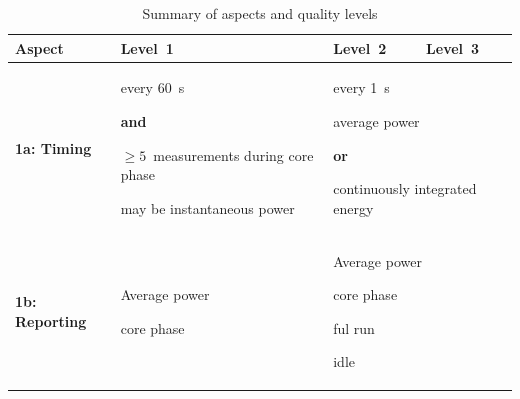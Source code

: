\newlength{\tablecolumnwidth}
\setlength{\tablecolumnwidth}{3.5cm}
\noindent
\begin{table}
\caption{Summary of aspects and quality levels}
\label{tab:levels}
\begin{tabular}{|p{2.5cm}|p{3.5cm}|p{3.5cm}|p{3.5cm}|} \hline
\textbf{Aspect}&\textbf{Level~1}&\textbf{Level~2}&\textbf{Level~3}\\ \hline

\textbf{1a: Timing} &
\begin{minipage}[t]{\tablecolumnwidth}
      \begin{compactitemize}
            \item every 60~s
            \item[] \textbf{and}
            \item $\ge5$~measurements during core phase
            \item may be instantaneous power
      \end{compactitemize}
\end{minipage} &
\multicolumn{2}{p{2\tablecolumnwidth}|}{
      \begin{minipage}[t]{2\tablecolumnwidth}
            \begin{compactitemize}
                  \item every 1~s
                  \item average power
                  \item[] \textbf{or}
                  \item continuously integrated energy
            \end{compactitemize}
      \end{minipage}
} \\
\hline


\textbf{1b: Reporting} &
\begin{minipage}[t]{\tablecolumnwidth}
      Average power
      \begin{compactitemize}
            \item core phase
      \end{compactitemize}
\end{minipage} &
\multicolumn{2}{p{2\tablecolumnwidth}|}{
      \begin{minipage}[t]{2\tablecolumnwidth}
            Average power
            \begin{compactitemize}
                  \item core phase
                  \item ful run
                  \item idle
            \end{compactitemize}
      \end{minipage}
} \\
\hline



\end{tabular}
\end{table}
